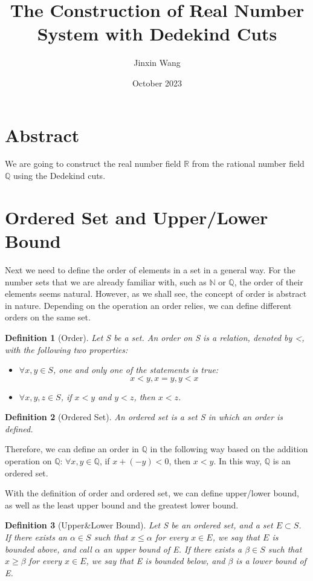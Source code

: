 \documentclass[onecolumn]{article}
\title{The Construction of Real Number System with Dedekind Cuts}
\author{Jinxin Wang}
\date{October 2023}
\newtheorem{definition}{Definition}[section]
\begin{document}
\maketitle

\section{Abstract}

We are going to construct the real number field $\mathbb{R}$ from the rational 
number field $\mathbb{Q}$ using the Dedekind cuts.

\section{Ordered Set and Upper/Lower Bound}

Next we need to define the order of elements in a set in a general way. For the
number sets that we are already familiar with, such as $\mathbb{N}$ or 
$\mathbb{Q}$, the order of their elements seems natural. However, as we shall 
see, the concept of order is abstract in nature. Depending on the operation an 
order relies, we can define different orders on the same set.

\begin{definition}[Order]
  Let S be a set. An order on S is a relation, denoted by <, with the following 
  two properties:
  \begin{itemize}
    \item $\forall x, y \in S$, one and only one of the statements is true:
    \[
      x < y, x = y, y < x
    \]
    \item $\forall x, y, z \in S$, if $x < y$ and $y < z$, then $x < z$.
  \end{itemize}
\end{definition}

\begin{definition}[Ordered Set]
  An ordered set is a set S in which an order is defined.
\end{definition}

Therefore, we can define an order in $\mathbb{Q}$ in the following way based on 
the addition operation on $\mathbb{Q}$: $\forall x, y \in \mathbb{Q}$, if 
$x + (-y) < 0$, then $x < y$. In this way, $\mathbb{Q}$ is an ordered set.

With the definition of order and ordered set, we can define upper/lower bound, 
as well as the least upper bound and the greatest lower bound.

\begin{definition}[Upper\&Lower Bound]
  Let S be an ordered set, and a set $E \subset S$. If there exists an 
  $\alpha \in S$ such that $x \leq \alpha$ for every $x \in E$, we say that $E$ 
  is bounded above, and call $\alpha$ an upper bound of E. If there exists a 
  $\beta \in S$ such that $x \geq \beta$ for every $x \in E$, we say that E is 
  bounded below, and $\beta$ is a lower bound of E.
\end{definition}
\end{document}
